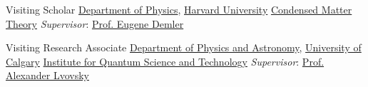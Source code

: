 \documentclass[10pt,a4paper,sans]{moderncv}
\begin{document}
	{Visiting Scholar}
	{\textcolor{blue}{\href{http://physics.harvard.edu}{Department of Physics}}, \textcolor{blue}{\href{http://www.harvard.edu}{Harvard University}}}
	{\newline \textcolor{blue}{\href{http://cmt.harvard.edu}{Condensed Matter Theory}}}
	{\textit{Supervisor}: \textcolor{blue}{\href{http://cmt.harvard.edu/demler/}{Prof. Eugene Demler}}}{}        

	{Visiting Research Associate}
	{\textcolor{blue}{\href{http://phas.ucalgary.ca}{Department of Physics and Astronomy}}, \textcolor{blue}{\href{http://www.ucalgary.ca}{University of Calgary}}}
	{\newline \textcolor{blue}{\href{http://www.iqst.ca}{Institute for Quantum Science and Technology}}}
	{\textit{Supervisor}: \textcolor{blue}{\href{http://www.rqc.ru/members/alexander.lvovsky/}{Prof. Alexander Lvovsky}}}{}	
\end{document}
